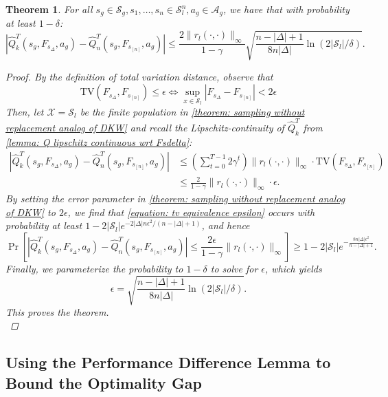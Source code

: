 \documentclass{article}
\theoremstyle{plain}
\newtheorem{theorem}{Theorem}[section]
\theoremstyle{definition}
\begin{document}
\begin{theorem}\label{theorem: Q-lipschitz of Fsdelta and Fsn}
    For all $s_g \in \mathcal{S}_g, s_1, \dots ,s_n \in \mathcal{S}_l^n, a_g \in \mathcal{A}_g$, we have that with probability at least $1 - \delta$:
\[|\hat{Q}_k^T(s_g, F_{s_\Delta}, a_g) - \hat{Q}_n^T(s_g, F_{s_{[n]}}, a_g)| \leq \frac{2\|r_l(\cdot,\cdot)\|_\infty}{1-\gamma}\sqrt{\frac{n-|\Delta|+1}{8n|\Delta|}\ln ( 2|\mathcal{S}_l|/\delta)}.\]

\begin{proof}
By the definition of total variation distance, observe that 
\begin{equation}\label{equation: tv equivalence epsilon}\mathrm{TV}(F_{s_\Delta}, F_{s_{[n]}})\leq \epsilon \iff \sup_{x\in\mathcal{S}_l} |F_{s_\Delta} - F_{s_{[n]}}| < 2\epsilon\end{equation}
Then, let $\mathcal{X}=\mathcal{S}_l$ be the finite population in \cref{theorem: sampling without replacement analog of DKW} and
    recall the Lipschitz-continuity of $\hat{Q}_k^T$ from \cref{lemma: Q lipschitz continuous wrt Fsdelta}:
\begin{align*}\left|\hat{Q}_k^T(s_g,F_{s_\Delta},a_g) - \hat{Q}_n^T(s_g, F_{s_{[n]}}, a_g)\right| &\leq \left(\sum_{t=0}^{T-1} 2\gamma^t\right)\|r_l(\cdot,\cdot)\|_\infty \cdot \mathrm{TV}(F_{s_\Delta}, F_{s_{[n]}}) \\
&\leq \frac{2}{1-\gamma}\|r_l(\cdot,\cdot)\|_\infty\cdot\epsilon.
\end{align*}
By setting the error parameter in \cref{theorem: sampling without replacement analog of DKW} to $2\epsilon$, we find that \cref{equation: tv equivalence epsilon} occurs with probability at least $1-2|\mathcal{S}_l|e^{-2|\Delta|n\epsilon^2/(n-|\Delta|+1)}$, and hence
\[\Pr\left[\left|\hat{Q}_k^T(s_g,F_{s_\Delta},a_g) - \hat{Q}_n^T(s_g, F_{s_{[n]}}, a_g)\right| \leq \frac{2\epsilon}{1-\gamma}\|r_l(\cdot,\cdot)\|_\infty\right]\geq 1 - 2|\mathcal{S}_l|e^{-\frac{8n|\Delta|\epsilon^2}{n-|\Delta|+1}}.\]
Finally, we parameterize the probability to $1-\delta$ to solve for $\epsilon$, which yields \[\epsilon = \sqrt{\frac{n-|\Delta|+1}{8n|\Delta|}\ln(2|\mathcal{S}_l|/\delta)}.\]
This proves the theorem.\qedhere \\
\end{proof}
\end{theorem}

\subsection{Using the Performance Difference Lemma to Bound the Optimality Gap}
\end{document}
